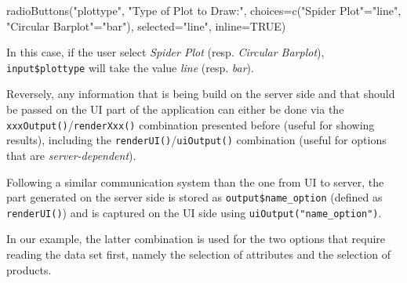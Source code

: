 \documentclass[
]{krantz}
\makeatletter
\newenvironment{Shaded}{\begin{snugshade}}{\end{snugshade}}
\newcommand{\AttributeTok}[1]{\textcolor[rgb]{0.61,0.61,0.61}{#1}}
\newcommand{\ConstantTok}[1]{\textcolor[rgb]{0,0,0}{#1}}
\newcommand{\FunctionTok}[1]{\textcolor[rgb]{0,0,0}{#1}}
\newcommand{\NormalTok}[1]{#1}
\newcommand{\OtherTok}[1]{\textcolor[rgb]{0.37,0.37,0.37}{#1}}
\newcommand{\StringTok}[1]{\textcolor[rgb]{0.5,0.5,0.5}{#1}}
\newenvironment{kframe}{%
\medskip{}
\setlength{\fboxsep}{.8em}
 \def\at@end@of@kframe{}%
 \ifinner\ifhmode%
  \def\at@end@of@kframe{\end{minipage}}%
  \begin{minipage}{\columnwidth}%
 \fi\fi%
 \def\FrameCommand##1{\hskip\@totalleftmargin \hskip-\fboxsep
 \colorbox{shadecolor}{##1}\hskip-\fboxsep
     \hskip-\linewidth \hskip-\@totalleftmargin \hskip\columnwidth}%
 \MakeFramed {\advance\hsize-\width
   \@totalleftmargin\z@ \linewidth\hsize
   \@setminipage}}%
 {\par\unskip\endMakeFramed%
 \at@end@of@kframe}
\renewenvironment{Shaded}{\begin{kframe}}{\end{kframe}}
\makeatother
\begin{document}
\begin{Shaded}
\begin{Highlighting}[]
\FunctionTok{radioButtons}\NormalTok{(}\StringTok{"plottype"}\NormalTok{, }\StringTok{"Type of Plot to Draw:"}\NormalTok{, }
             \AttributeTok{choices=}\FunctionTok{c}\NormalTok{(}\StringTok{"Spider Plot"}\OtherTok{=}\StringTok{"line"}\NormalTok{, }\StringTok{"Circular Barplot"}\OtherTok{=}\StringTok{"bar"}\NormalTok{), }
             \AttributeTok{selected=}\StringTok{"line"}\NormalTok{, }\AttributeTok{inline=}\ConstantTok{TRUE}\NormalTok{)}
\end{Highlighting}
\end{Shaded}

In this case, if the user select \emph{Spider Plot} (resp. \emph{Circular Barplot}), \texttt{input\$plottype} will take the value \emph{line} (resp. \emph{bar}).

Reversely, any information that is being build on the server side and that should be passed on the UI part of the application can either be done via the \texttt{xxxOutput()}/\texttt{renderXxx()} combination presented before (useful for showing results), including the \texttt{renderUI()}/\texttt{uiOutput()} combination (useful for options that are \emph{server-dependent}).

Following a similar communication system than the one from UI to server, the part generated on the server side is stored as \texttt{output\$name\_option} (defined as \texttt{renderUI()}) and is captured on the UI side using \texttt{uiOutput("name\_option")}.

In our example, the latter combination is used for the two options that require reading the data set first, namely the selection of attributes and the selection of products.
\end{document}
